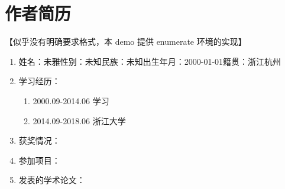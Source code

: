 \chapter*{作者简历}

【似乎没有明确要求格式，本 demo 提供 enumerate 环境的实现】

\begin{enumerate}[label=,leftmargin=0em]
\item 姓名：未雅\quad 性别：未知\quad 民族：未知\quad 出生年月：2000-01-01\quad 籍贯：浙江杭州
\item 学习经历：
\begin{enumerate}[label=]
\item 2000.09-2014.06 学习
\item 2014.09-2018.06 浙江大学
\end{enumerate}
\item 获奖情况：
\item 参加项目：
\item 发表的学术论文：
\end{enumerate}